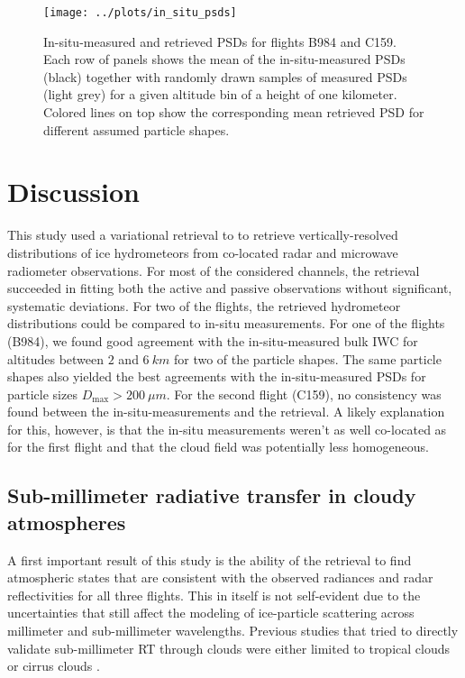 \documentclass[journal abbreviation, manuscript]{copernicus}
\begin{document}
\begin{figure}[!hbpt]
  \centering
  \texttt{[image: ../plots/in\_situ\_psds]}
  \caption{In-situ-measured and retrieved PSDs for flights B984
    and C159. Each row of panels shows the mean of the in-situ-measured
    PSDs (black) together with randomly drawn samples of measured PSDs
    (light grey) for a given altitude bin of a height of one kilometer.
    Colored lines on top show the corresponding mean retrieved PSD for
    different assumed particle shapes.}
  \label{fig:in_situ_psds}
\end{figure}

\section{Discussion}
\label{sec:discussion}

This study used a variational retrieval to to retrieve vertically-resolved
distributions of ice hydrometeors from co-located radar and microwave radiometer
observations. For most of the considered channels, the retrieval succeeded in
fitting both the active and passive observations without significant, systematic
deviations. For two of the flights, the retrieved hydrometeor distributions
could be compared to in-situ measurements. For one of the flights (B984), we
found good agreement with the in-situ-measured bulk IWC for altitudes between
$2$ and $6\ \unit{km}$ for two of the particle shapes. The same particle shapes
also yielded the best agreements with the in-situ-measured PSDs for particle
sizes $D_\text{max} > 200\ \unit{\mu m}$. For the second flight (C159), no
consistency was found between the in-situ-measurements and the retrieval. A
likely explanation for this, however, is that the in-situ measurements weren't
as well co-located as for the first flight and that the cloud field was
potentially less homogeneous.

\subsection{Sub-millimeter radiative transfer in cloudy atmospheres}

 A first important result of this study is the ability of the retrieval to find
 atmospheric states that are consistent with the observed radiances and radar
 reflectivities for all three flights. This in itself is not self-evident due to
 the uncertainties that still affect the modeling of ice-particle scattering
 across millimeter and sub-millimeter wavelengths. Previous studies that tried
 to directly validate sub-millimeter RT through clouds were either limited to
 tropical clouds \citep{evans05, eriksson07} or cirrus clouds \citep{fox17}.
\end{document}

